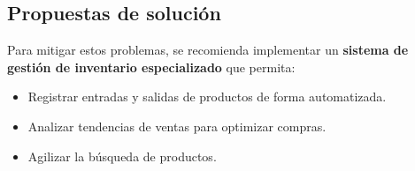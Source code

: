 \subsection*{\centering Propuestas de solución}
Para mitigar estos problemas, se recomienda implementar un \textbf{sistema de gestión de inventario especializado} que permita:
\begin{itemize}
    \item Registrar entradas y salidas de productos de forma automatizada.
    \item Analizar tendencias de ventas para optimizar compras.
    \item Agilizar la búsqueda de productos.
\end{itemize}

